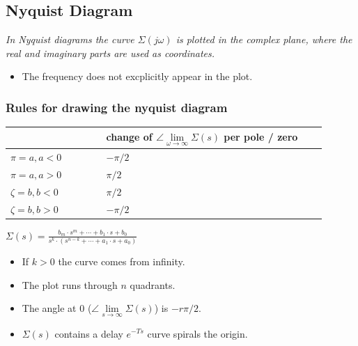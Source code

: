 \documentclass[10pt,a4paper]{scrartcl}
\begin{document}
\begin{multicols*}{3}
	\subsection{Nyquist Diagram}
	
	\emph{In Nyquist diagrams the curve $\Sigma(j\omega)$ is plotted in the complex plane, where the real and imaginary parts are used as coordinates.}
	
	\begin{itemize}
	\compaq
	\item
	The frequency does not excplicitly appear in the plot.
	\end{itemize}
	
	
	
	
	\subsubsection{Rules for drawing the nyquist diagram}
	
	\begin{tabular}{p{0.275\linewidth}|p{0.625\linewidth}}
	&change of $\angle\lim\limits_{\omega\rightarrow\infty}{\Sigma(s)}$ per pole / zero\\
	\hline
	$\pi=a,a<0$&$-\pi/2$\\
	$\pi=a,a>0$&$\pi/2$\\
	\hline
	$\zeta=b,b<0$&$\pi/2$\\
	$\zeta=b,b>0$&$-\pi/2$\\
	\hline
	\end{tabular}
	
	\begin{center}
	\large
	$\Sigma(s)=\frac{b_m\cdot s^m+\cdots +b_1\cdot s + b_0}{s^k\cdot(s^{n-k}+\cdots+a_1\cdot s+a_0)}$
	\normalsize
	\end{center}
	
	
	\begin{itemize}
	\compaq
	\item
	If $k>0$ the curve comes from infinity.
	\item
	The plot runs through $n$ quadrants.
	\item
	The angle at 0 ($\angle\lim\limits_{s\rightarrow\infty}{\Sigma(s)}$) is $-r\pi/2$.
	\item
	$\Sigma(s)$ contains a delay $e^{-Ts}$ \dahe curve spirals the origin.
	\end{itemize}
	

\end{multicols*}
\end{document}
